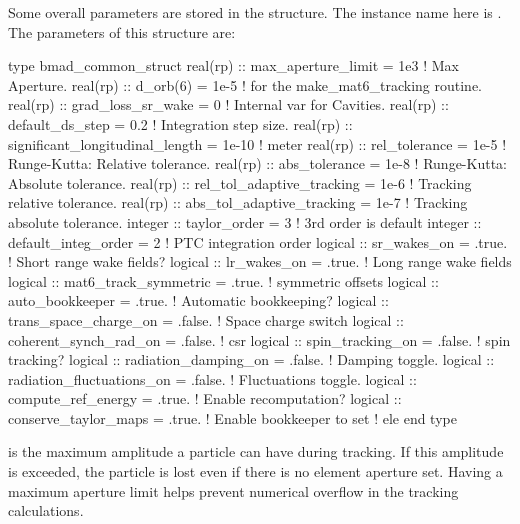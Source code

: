 Some overall parameters are stored in the 
structure. The instance name here is . The parameters of
this structure are:
\begin{example}
  type bmad_common_struct
    real(rp) :: max_aperture_limit = 1e3       ! Max Aperture.
    real(rp) :: d_orb(6)           = 1e-5      ! for the make_mat6_tracking routine.
    real(rp) :: grad_loss_sr_wake  = 0         ! Internal var for Cavities.
    real(rp) :: default_ds_step    = 0.2       ! Integration step size.  
    real(rp) :: significant_longitudinal_length = 1e-10 ! meter 
    real(rp) :: rel_tolerance = 1e-5           ! Runge-Kutta: Relative tolerance.
    real(rp) :: abs_tolerance = 1e-8           ! Runge-Kutta: Absolute tolerance.
    real(rp) :: rel_tol_adaptive_tracking = 1e-6  ! Tracking relative tolerance.
    real(rp) :: abs_tol_adaptive_tracking = 1e-7  ! Tracking absolute tolerance.
    integer :: taylor_order = 3                ! 3rd order is default
    integer :: default_integ_order = 2         ! PTC integration order
    logical :: sr_wakes_on = .true.            ! Short range wake fields?
    logical :: lr_wakes_on = .true.            ! Long range wake fields
    logical :: mat6_track_symmetric = .true.   ! symmetric offsets
    logical :: auto_bookkeeper = .true.        ! Automatic bookkeeping?
    logical :: trans_space_charge_on = .false. ! Space charge switch
    logical :: coherent_synch_rad_on = .false. ! csr 
    logical :: spin_tracking_on = .false.      ! spin tracking?
    logical :: radiation_damping_on = .false.       ! Damping toggle.
    logical :: radiation_fluctuations_on = .false.  ! Fluctuations toggle.
    logical :: compute_ref_energy = .true.          ! Enable recomputation?
    logical :: conserve_taylor_maps = .true.        ! Enable bookkeeper to set
                                                    ! ele%
  end type
\end{example}

 is the maximum amplitude a particle can have
during tracking. If this amplitude is exceeded, the particle is
lost even if there is no element aperture set. Having a maximum
aperture limit helps prevent numerical overflow in the tracking calculations.


